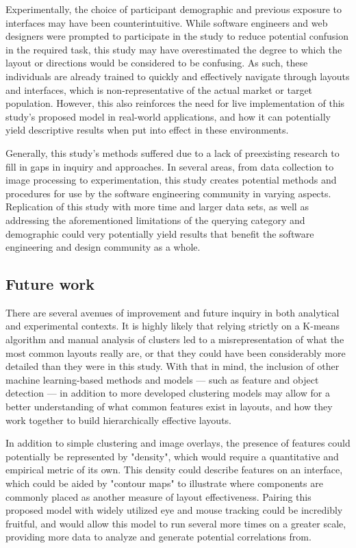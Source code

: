 \documentclass[conference]{IEEEtran}
\begin{document}
Experimentally, the choice of participant demographic and previous exposure to interfaces may have been counterintuitive. While software engineers and web designers were prompted to participate in the study to reduce potential confusion in the required task, this study may have overestimated the degree to which the layout or directions would be considered to be confusing. As such, these individuals are already trained to quickly and effectively navigate through layouts and interfaces, which is non-representative of the actual market or target population. However, this also reinforces the need for live implementation of this study's proposed model in real-world applications, and how it can potentially yield descriptive results when put into effect in these environments.

Generally, this study's methods suffered due to a lack of preexisting research to fill in gaps in inquiry and approaches. In several areas, from data collection to image processing to experimentation, this study creates potential methods and procedures for use by the software engineering community in varying aspects. Replication of this study with more time and larger data sets, as well as addressing the aforementioned limitations of the querying category and demographic could very potentially yield results that benefit the software engineering and design community as a whole.

\subsection{Future work}

There are several avenues of improvement and future inquiry in both analytical and experimental contexts. It is highly likely that relying strictly on a K-means algorithm and manual analysis of clusters led to a misrepresentation of what the most common layouts really are, or that they could have been considerably more detailed than they were in this study. With that in mind, the inclusion of other machine learning-based methods and models — such as feature and object detection — in addition to more developed clustering models may allow for a better understanding of what common features exist in layouts, and how they work together to build hierarchically effective layouts.

In addition to simple clustering and image overlays, the presence of features could potentially be represented by "density", which would require a quantitative and empirical metric of its own. This density could describe features on an interface, which could be aided by "contour maps" to illustrate where components are commonly placed as another measure of layout effectiveness. Pairing this proposed model with widely utilized eye and mouse tracking could be incredibly fruitful, and would allow this model to run several more times on a greater scale, providing more data to analyze and generate potential correlations from.
\end{document}

